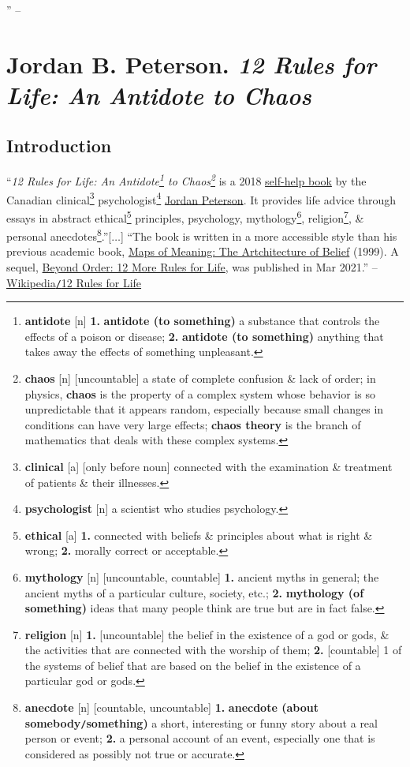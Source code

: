 \documentclass[oneside]{book}
\numberwithin{equation}{section}
\begin{document}
'' -- \cite{Grosholz2018}


\chapter{Jordan B. Peterson. \textit{12 Rules for Life: An Antidote to Chaos}}

\section*{Introduction}
``\textit{12 Rules for Life: An Antidote\footnote{\textbf{antidote} [n] \textbf{1.} \textbf{antidote (to something)} a substance that controls the effects of a poison or disease; \textbf{2.} \textbf{antidote (to something)} anything that takes away the effects of something unpleasant.} to Chaos\footnote{\textbf{chaos} [n] [uncountable] a state of complete confusion \& lack of order; in physics, \textbf{chaos} is the property of a complex system whose behavior is so unpredictable that it appears random, especially because small changes in conditions can have very large effects; \textbf{chaos theory} is the branch of mathematics that deals with these complex systems.}} is a 2018 \href{https://en.wikipedia.org/wiki/Self-help_book}{self-help book} by the Canadian clinical\footnote{\textbf{clinical} [a] [only before noun] connected with the examination \& treatment of patients \& their illnesses.} psychologist\footnote{\textbf{psychologist} [n] a scientist who studies psychology.} \href{https://en.wikipedia.org/wiki/Jordan_Peterson}{Jordan Peterson}. It provides life advice through essays in abstract ethical\footnote{\textbf{ethical} [a] \textbf{1.} connected with beliefs \& principles about what is right \& wrong; \textbf{2.} morally correct or acceptable.} principles, psychology, mythology\footnote{\textbf{mythology} [n] [uncountable, countable] \textbf{1.} ancient myths in general; the ancient myths of a particular culture, society, etc.; \textbf{2.} \textbf{mythology (of something)} ideas that many people think are true but are in fact false.}, religion\footnote{\textbf{religion} [n] \textbf{1.} [uncountable] the belief in the existence of a god or gods, \& the activities that are connected with the worship of them; \textbf{2.} [countable] 1 of the systems of belief that are based on the belief in the existence of a particular god or gods.}, \& personal anecdotes\footnote{\textbf{anecdote} [n] [countable, uncountable] \textbf{1.} \textbf{anecdote (about somebody\texttt{/}something)} a short, interesting or funny story about a real person or event; \textbf{2.} a personal account of an event, especially one that is considered as possibly not true or accurate.}.''[$\ldots$] ``The book is written in a more accessible style than his previous academic book, \href{https://en.wikipedia.org/wiki/Maps_of_Meaning:_The_Architecture_of_Belief}{Maps of Meaning: The Artchitecture of Belief} (1999). A sequel, \href{https://en.wikipedia.org/wiki/Beyond_Order}{Beyond Order: 12 More Rules for Life}, was published in Mar 2021.'' -- \href{https://en.wikipedia.org/wiki/12_Rules_for_Life}{Wikipedia\texttt{/}12 Rules for Life}
\end{document}
